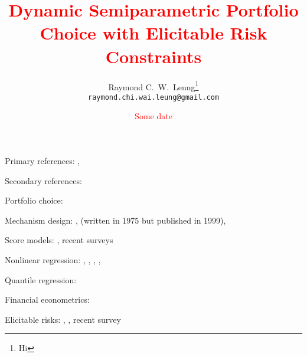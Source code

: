 \documentclass{article}
\title{\textcolor{red}{Dynamic Semiparametric Portfolio Choice with Elicitable Risk Constraints}}
\date{\textcolor{red}{Some date}}
\author{%
  Raymond C.\ W.\ Leung\thanks{Hi} \\
  \texttt{raymond.chi.wai.leung@gmail.com} 
}
\theoremstyle{plain}
\theoremstyle{remark}
\begin{document}
\maketitle


\begin{abstract}
	\lipsum[77]
\end{abstract}

Primary references: \cite{patton2019dynamic}, \cite{chen2016semiparametric}

Secondary references: \cite{dimitriadis2019joint}

Portfolio choice: \cite{brandt1999estimating}

Mechanism design: \cite{rogerson1985first}, \cite{mirrlees1999theory} (written in 1975 but published in 1999), \cite{jewitt1988justifying}

Score models: \cite{creal2013generalized}, recent surveys \cite{artemova2022scoretheory, artemova2022scoreapplications}

Nonlinear regression: \cite{huber1967behavior}, \cite{white1984nonlinear}, \cite{oberhofer1982consistency}, \cite{powell1984least}, \cite{weiss1991estimating}

Quantile regression: \cite{koenker2005quantile, koenker2017quantile}

Financial econometrics: \cite{engle2004caviar}

Elicitable risks: \cite{fissler2016higher}, \cite{gneiting2011making},  recent survey \cite{he2022risk}



\newpage



\newpage


%
\end{document}

